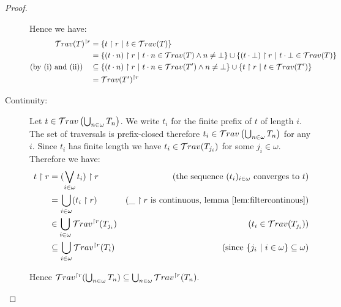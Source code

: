 \begin{proof}
\begin{description}
        Hence we have:
        \begin{align*}
        \travset(T)^{\upharpoonright r} &= \{ t \upharpoonright r \ | \ t \in \travset(T)     \} \\
        & = \{ (t\cdot n) \upharpoonright r \ | \ t\cdot n \in \travset(T) \wedge n \neq \bot \}
            \union \{ (t \cdot \bot ) \upharpoonright r \ | \ t \cdot \bot \in \travset(T)  \} \\
\mbox{(by (i) and (ii))} \quad        & \subseteq  \{ (t\cdot n)
\upharpoonright r \ | \ t\cdot n \in \travset(T') \wedge n \neq \bot
\}
            \union \{ t \upharpoonright r \ | \ t \in \travset(T')  \} \\
        & = \travset(T')^{\upharpoonright r}
        \end{align*}

        \item[Continuity:] Let $t \in \mathcal{T}rav \left( \bigcup_{n\in\omega} T_n \right)$.
        We write $t_i$ for the finite prefix of $t$ of length $i$.
        The set of traversals is prefix-closed therefore $t_i \in \mathcal{T}rav \left( \bigcup_{n\in\omega} T_n \right)$ for any $i$.
        Since $t_i$ has finite length we have $t_i \in \mathcal{T}rav(T_{j_i})$ for some $j_i \in \omega$.
        Therefore we have:
        \begin{align*}
          t \upharpoonright r &= (\bigvee_{i\in\omega} t_i ) \upharpoonright r   & (\mbox{the sequence $(t_i)_{i\in\omega}$ converges to $t$}) \\
          &= \bigcup_{i\in\omega} ( t_i \upharpoonright r )   & (\_ \upharpoonright r \mbox{ is continuous, lemma \ref{lem:filtercontinous}}) \\
          &\in \bigcup_{i\in\omega} \mathcal{T}rav^{\upharpoonright r}(T_{j_i})   & (t_i \in \mathcal{T}rav(T_{j_i})) \\
          &\subseteq \bigcup_{i\in\omega} \mathcal{T}rav^{\upharpoonright r}(T_i)   & (\mbox{since } \{ j_i \ | \  i \in \omega \} \subseteq \omega)
        \end{align*}

        Hence $\mathcal{T}rav^{\upharpoonright r} (\bigcup_{n\in\omega} T_n ) \subseteq \bigcup_{n\in\omega} \mathcal{T}rav^{\upharpoonright r}(T_n).$

    \end{description}
\end{proof}

